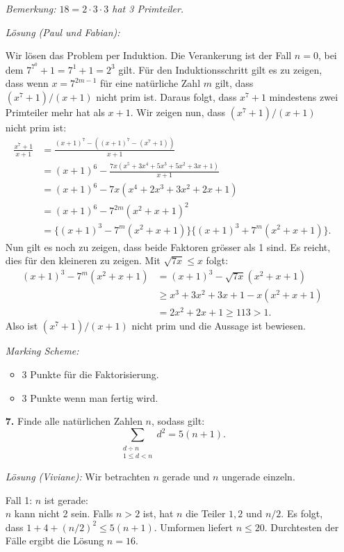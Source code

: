 \documentclass[language=german,style=solution]{smo}
\begin{document}
\begin{enumerate}
\textit{Bemerkung: $18 = 2\cdot 3\cdot 3$ hat 3 Primteiler.}

\textit{Lösung (Paul und Fabian):}

Wir lösen das Problem per Induktion. Die Verankerung ist der Fall $n = 0$, bei dem $7^{7^0} + 1 = 7^1 + 1 = 2^3$ gilt. Für den Induktionsschritt gilt es zu zeigen, dass wenn $x = 7^{2m - 1}$ für eine natürliche Zahl $m$ gilt, dass $(x^7 + 1)/(x + 1)$ nicht prim ist. Daraus folgt, dass $x^7 + 1$ mindestens zwei Primteiler mehr hat als  $x + 1$. Wir zeigen nun, dass $(x^7 + 1)/(x + 1)$ nicht prim ist:
\begin{align*}
\frac{x^7 + 1}{x + 1} &= \frac{(x + 1)^7 - ((x + 1)^7 - (x^7 + 1))}{x + 1} \\
&= (x + 1)^6 - \frac{7x(x^5 + 3x^4 + 5x^3 + 5x^2 + 3x + 1)}{x + 1} \\
&= (x + 1)^6 - 7x(x^4 + 2x^3 + 3x^2 + 2x + 1) \\
&= (x + 1)^6 - 7^{2m}(x^2 + x + 1)^2 \\
&= \{(x + 1)^3 - 7^m(x^2 + x + 1)\}\{(x + 1)^3 + 7^m(x^2 + x + 1)\}.
\end{align*}
Nun gilt es noch zu zeigen, dass beide Faktoren grösser als 1 sind. Es reicht, dies für den kleineren zu zeigen. Mit $\sqrt{7x}\leq x$ folgt:
\begin{align*}
(x + 1)^3 - 7^m(x^2 + x + 1) &= (x + 1)^3 - \sqrt{7x}(x^2 + x + 1) \\
&\geq x^3 + 3x^2 + 3x + 1 - x(x^2 + x + 1) \\
&= 2x^2 + 2x + 1\geq 113 > 1.
\end{align*}
Also ist $(x^7 + 1)/(x + 1)$ nicht prim und die Aussage ist bewiesen.

\textit{Marking Scheme:}
\begin{itemize}
\item 3 Punkte für die Faktorisierung.
\item 3 Punkte wenn man fertig wird.
\end{itemize}

\newpage

\item[\textbf{7.}] %
Finde alle natürlichen Zahlen $n$, sodass gilt:
\[
\sum_{\substack{d\div n\\ 1\leq d < n}} d^2=5(n+1).
\]

\textit{Lösung (Viviane):}
Wir betrachten $n$ gerade und $n$ ungerade einzeln.

Fall 1: $n$ ist gerade:\\
$n$ kann nicht 2 sein. Falls $n>2$ ist, hat $n$ die Teiler $1, 2$ und $n/2$. Es folgt, dass $1+4+(n/2)^2\leq 5(n+1)$. Umformen liefert $n\leq20$. Durchtesten der Fälle ergibt die Lösung $n=16$.


\end{enumerate}
\end{document}
